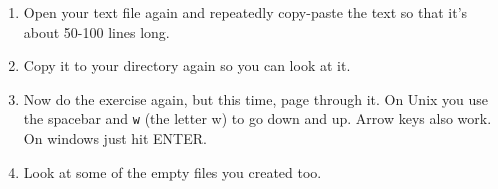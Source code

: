 \begin{enumerate}
\item Open your text file again and repeatedly copy-paste the text so that it's about 50-100 lines long.
\item Copy it to your  directory again so you can look at it.
\item Now do the exercise again, but this time, page through it.  On Unix you use
    the spacebar and \verb|w| (the letter w) to go down and up.  Arrow keys also work. On windows just hit ENTER.
\item Look at some of the empty files you created too.
\end{enumerate}

